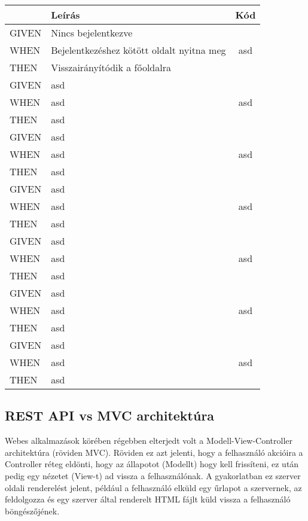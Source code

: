 \begin{table}[H]
	\centering
	\begin{tabular}{|l|l|c|}
		\hline
		& \textbf{Leírás} & \textbf{Kód} \\
		\hline
		GIVEN & Nincs bejelentkezve & \multirow{3}{*}{asd} \\ \cline{1-2}
		WHEN & Bejelentkezéshez kötött oldalt nyitna meg & \\ \cline{1-2}
		THEN & Visszairányítódik a főoldalra & \\ 
		\hline
		GIVEN & asd & \multirow{3}{*}{asd} \\ \cline{1-2}
		WHEN & asd & \\ \cline{1-2}
		THEN & asd & \\ 
		\hline
		GIVEN & asd & \multirow{3}{*}{asd} \\ \cline{1-2}
		WHEN & asd & \\ \cline{1-2}
		THEN & asd & \\ 
		\hline
		GIVEN & asd & \multirow{3}{*}{asd} \\ \cline{1-2}
		WHEN & asd & \\ \cline{1-2}
		THEN & asd & \\ 
		\hline
		GIVEN & asd & \multirow{3}{*}{asd} \\ \cline{1-2}
		WHEN & asd & \\ \cline{1-2}
		THEN & asd & \\ 
		\hline
		GIVEN & asd & \multirow{3}{*}{asd} \\ \cline{1-2}
		WHEN & asd & \\ \cline{1-2}
		THEN & asd & \\ 
		\hline
		GIVEN & asd & \multirow{3}{*}{asd} \\ \cline{1-2}
		WHEN & asd & \\ \cline{1-2}
		THEN & asd & \\ 
		\hline
	\end{tabular}
\end{table}

\subsection{REST API vs MVC architektúra}
Webes alkalmazások körében régebben elterjedt volt a Modell-View-Controller architektúra (röviden MVC). Röviden ez azt jelenti, hogy a felhasználó akcióira a Controller réteg eldönti, hogy az állapotot (Modellt) hogy kell frissíteni, ez után pedig egy nézetet (View-t) ad vissza a felhasználónak. A gyakorlatban ez szerver oldali renderelést jelent, például a felhasználó elküld egy űrlapot a szervernek, az feldolgozza és egy szerver által renderelt HTML fájlt küld vissza a felhasználó böngészőjének.

